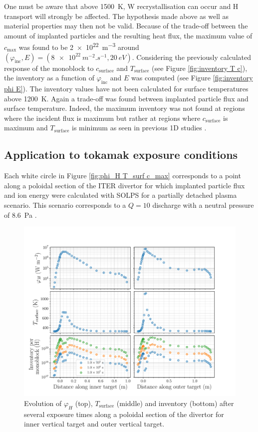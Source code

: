 One must be aware that above \SI{1500}{K}, W recrystallisation can occur and H transport will strongly be affected.
The hypothesis made above as well as material properties may then not be valid.
Because of the trade-off between the amount of implanted particles and the resulting heat flux, the maximum value of $c_{\mathrm{max}}$ was found to be \SI{2e22}{m^{-3}} around $(\varphi_\mathrm{inc}, E)=(\SI{8e22}{m^{-2}.s^{-1}}, \SI{20}{eV})$.
Considering the previously calculated response of the monoblock to $c_\mathrm{surface}$ and $T_\mathrm{surface}$ (see Figure \ref{fig:inventory T c}), the inventory as a function of $\varphi_\mathrm{inc}$ and $E$ was computed (see Figure \ref{fig:inventory phi E}).
The inventory values have not been calculated for surface temperatures above \SI{1200}{K}.
Again a trade-off was found between implanted particle flux and surface temperature.
Indeed, the maximum inventory was not found at regions where the incident flux is maximum but rather at regions where $c_\mathrm{surface}$ is maximum and $T_\mathrm{surface}$ is minimum as seen in previous 1D studies \cite{hodille_estimation_2017}.

\subsection{Application to tokamak exposure conditions} \label{ITER application}
Each white circle in Figure \ref{fig:phi_H T_surf c_max} corresponds to a point along a poloidal section of the ITER divertor for which implanted particle flux and ion energy were calculated with SOLPS \cite{bonnin_presentation_2016} for a partially detached plasma scenario.
This scenario corresponds to a $Q=10$ discharge with a neutral pressure of \SI{8.6}{Pa} \cite{pitts_physics_2019}.


\begin{figure} [t]
    \centering
    \includegraphics[width=0.8\linewidth]{Figures/Chapter3/monoblocks/parametric_study/along_divertor.pdf}
    \caption{Evolution of $\varphi_H$ (top), $T_\mathrm{surface}$ (middle) and inventory (bottom) after several exposure times along a poloidal section of the divertor for inner vertical target and outer vertical target.}
    \label{fig:along divertor}
\end{figure}

